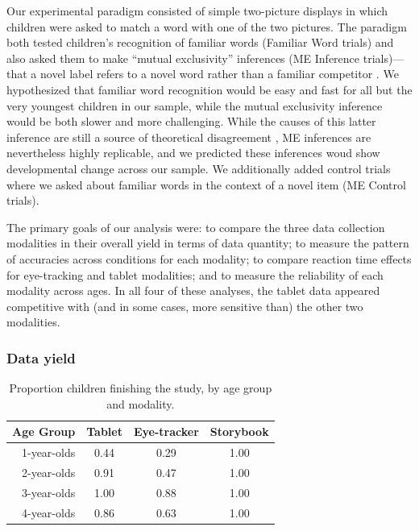 \documentclass[man,noapacite]{apa2}
\begin{document}
Our experimental paradigm consisted of simple two-picture displays in which children were asked to match a word with one of the two pictures. The paradigm both tested children's recognition of familiar words (Familiar Word trials) and also asked them to make ``mutual exclusivity''  inferences  (ME Inference trials)---that a novel label refers to a novel word rather than a familiar competitor \cite{markman1988}. We hypothesized that familiar word recognition would be easy and fast for all but the very youngest children in our sample, while the mutual exclusivity inference would be both slower and more challenging. While the causes of this latter inference are still a source of theoretical disagreement \cite{markman2003,diesendruck2001,frank2009,bion2013}, ME inferences are nevertheless highly replicable, and we predicted these inferences woud show developmental change across our sample. We additionally added control trials where we asked about familiar words in the context of a novel item (ME Control trials).

The primary goals of our analysis were: to compare the three data collection modalities in their overall yield in terms of data quantity; to measure the pattern of accuracies across conditions for each modality; to compare reaction time effects for eye-tracking and tablet modalities; and to measure the reliability of each modality across ages. In all four of these analyses, the tablet data appeared competitive with (and in some cases, more sensitive than) the other two modalities. 

\subsubsection{Data yield} 

\begin{table}[t]
\centering
\caption{Proportion children finishing the study, by age group and modality.\label{tab:completion}}

\begin{tabular}{rccc}
  \hline
Age Group & Tablet & Eye-tracker & Storybook \\ 
  \hline
1-year-olds & 0.44 & 0.29& 1.00 \\ 
2-year-olds & 0.91 & 0.47 & 1.00\\ 
3-year-olds & 1.00 & 0.88 & 1.00\\ 
4-year-olds & 0.86 & 0.63 & 1.00\\ 
   \hline
\end{tabular}
\end{table}
\end{document}
